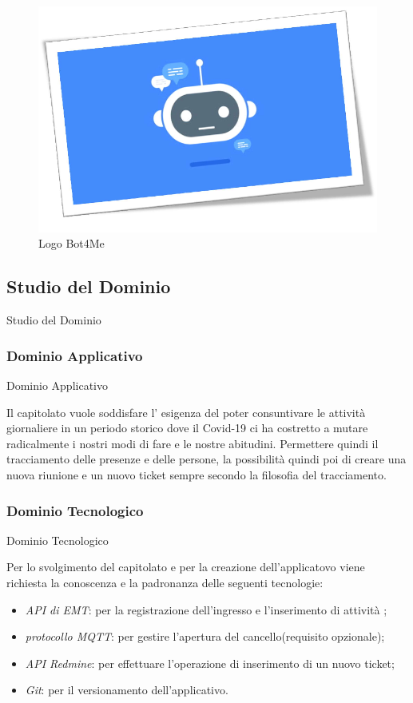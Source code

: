 \documentclass[11pt]{article}
\begin{document}
    \begin{figure}[h!]
        \centering
        \includegraphics[scale=0.4]{Res/BotMe.png}
        \caption{Logo Bot4Me}
        \label{Bot4Me}
    \end{figure} 
    
    \subsection{Studio del Dominio} Studio del Dominio
        \subsubsection{Dominio Applicativo} Dominio Applicativo
        
        Il capitolato vuole soddisfare l' esigenza del poter consuntivare le attività giornaliere in un periodo storico dove il Covid-19 ci ha costretto a mutare radicalmente i nostri modi di fare e le nostre abitudini.
        Permettere quindi il tracciamento delle presenze e delle persone, la possibilità quindi poi di creare una nuova riunione e un nuovo ticket sempre secondo la filosofia del tracciamento.
        \subsubsection{Dominio Tecnologico} Dominio Tecnologico
        
        Per lo svolgimento del capitolato e per la creazione dell'applicatovo viene richiesta la conoscenza e la padronanza delle seguenti tecnologie:
        \begin{itemize}
            \item \textit{API  di EMT}: per la registrazione  dell’ingresso e l’inserimento di attività ;
            \item \textit{protocollo MQTT}: per gestire l’apertura del cancello(requisito opzionale);
            \item \textit{API Redmine}: per effettuare l’operazione di inserimento  di un nuovo ticket;
            \item \textit{Git}: per il versionamento dell'applicativo.
        \end{itemize}
    
\end{document}
